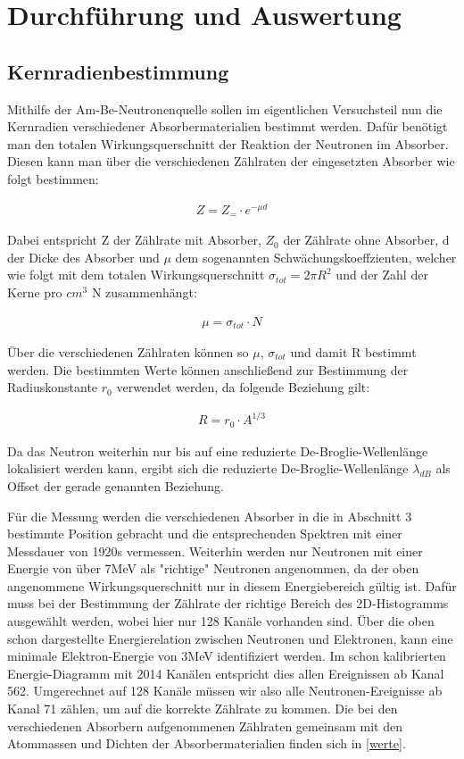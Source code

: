 \section{Durchführung und Auswertung}

\subsection{Kernradienbestimmung}

Mithilfe der Am-Be-Neutronenquelle sollen im eigentlichen Versuchsteil nun die Kernradien verschiedener Absorbermaterialien bestimmt werden. 
Dafür benötigt man den totalen Wirkungsquerschnitt der Reaktion der Neutronen im Absorber. Diesen kann man über die verschiedenen Zählraten der eingesetzten Absorber wie folgt bestimmen:

\begin{align}
Z=Z_=\cdot e^{-\mu d}
\end{align}

Dabei entspricht Z der Zählrate mit Absorber, $Z_0$ der Zählrate ohne Absorber, d der Dicke des Absorber und $\mu$ dem sogenannten Schwächungskoeffzienten, welcher wie folgt mit dem totalen Wirkungsquerschnitt $\sigma_{tot} = 2\pi R^2$ und der Zahl der Kerne pro $cm^3$ N zusammenhängt:

\begin{align}
\mu=\sigma_{tot}\cdot N 
\end{align}

Über die verschiedenen Zählraten können so $\mu$, $\sigma_{tot}$ und damit R bestimmt werden. Die bestimmten Werte können anschließend zur Bestimmung der Radiuskonstante $r_0$ verwendet werden, da folgende Beziehung gilt:

\begin{align}
R=r_0 \cdot A^{1/3}
\end{align}

Da das Neutron weiterhin nur bis auf eine reduzierte De-Broglie-Wellenlänge lokalisiert werden kann, ergibt sich die reduzierte De-Broglie-Wellenlänge $\lambda_{dB}$ als Offset der gerade genannten Beziehung.

Für die Messung werden die verschiedenen Absorber in die in Abschnitt 3 bestimmte Position gebracht und die entsprechenden Spektren mit einer Messdauer von 1920s vermessen. Weiterhin werden nur Neutronen mit einer Energie von über 7MeV als "richtige" Neutronen angenommen, da der oben angenommene Wirkungsquerschnitt nur in diesem Energiebereich gültig ist. Dafür muss bei der Bestimmung der Zählrate der richtige Bereich des 2D-Histogramms ausgewählt werden, wobei hier nur 128 Kanäle vorhanden sind. Über die oben schon dargestellte Energierelation zwischen Neutronen und Elektronen, kann eine minimale Elektron-Energie von 3MeV identifiziert werden. Im schon kalibrierten Energie-Diagramm mit 2014 Kanälen entspricht dies allen Ereignissen ab Kanal 562. Umgerechnet auf 128 Kanäle müssen wir also alle Neutronen-Ereignisse ab Kanal 71 zählen, um auf die korrekte Zählrate zu kommen. Die bei den verschiedenen Absorbern aufgenommenen Zählraten gemeinsam mit den Atommassen und Dichten der Absorbermaterialien finden sich in \ref{werte}. 


